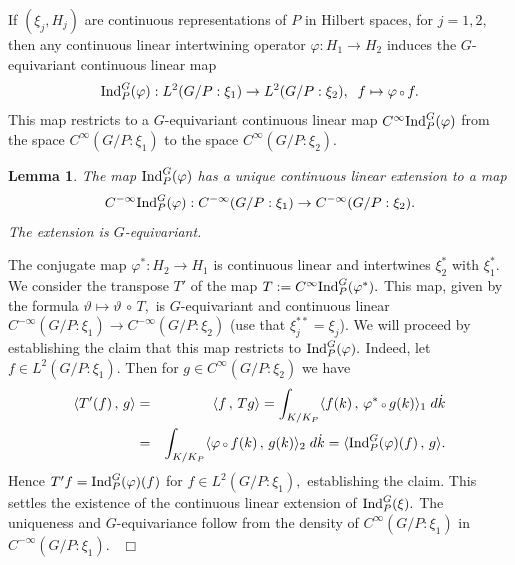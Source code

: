 \documentclass[12pt,a4paper]{article}
\newtheorem{Lemma}[Thm]{Lemma}
\newenvironment{lemma}[0]{\begin{Lemma}\noindent}%
{\end{Lemma}}
\def\proof{\par\noindent{\it Proof.}{\ }{\ }}
\def\qed{~\hfill\hbox{$\Box$}\medbreak}
\def\gf{\varphi}
\def\to{\rightarrow}
\def\inp#1#2{\langle#1\,,\,#2\rangle}
\def\after{\,{\scriptstyle\circ}\,}
\numberwithin{Thm}{section}
\numberwithin{equation}{section}
\def\Ind{{\rm Ind}}
\numberwithin{equation}{section}
\begin{document}
If $(\xi_j, H_j)$ are continuous representations of $P$ in Hilbert spaces,
 for $j=1,2,$ 
then any continuous linear intertwining operator $\gf: H_1 \to H_2$ induces the $G$-equivariant continuous linear map
$$ 
\Ind_P^G(\gf): L^2(G/P:\xi_1) \to L^2(G/P:\xi_2), \;\;f \mapsto \gf \after f.
$$%
This map restricts to a $G$-equivariant continuous linear map $C^\infty\Ind_P^G(\gf)$ from the space 
$C^\infty(G/P:\xi_1)$ to the space 
$C^\infty(G/P:\xi_2).$

\begin{lemma}
\label{l: functoriality C min infty}
The map $\Ind_P^G(\gf)$ has a unique continuous linear extension to a map 
$$
C^{-\infty}\Ind_P^G(\gf) : C^{-\infty}(G/P:\xi_1) \to C^{-\infty}(G/P:\xi_2).
$$%
The extension is $G$-equivariant.
\end{lemma} 

\proof 
The conjugate map $\gf^*: H_2 \to H_1$ is continuous linear and intertwines $\xi_2^*$ with $\xi_1^*.$ 
We consider the transpose $T'$ of the map $T:= C^\infty\Ind_P^G(\gf^*).$ This map, given by the formula
$\vartheta \mapsto \vartheta \after T,$  is $G$-equivariant and continuous linear 
$C^{-\infty}(G/P:\xi_1) \to C^{-\infty}(G/P: \xi_2)$ (use that $\xi_j^{**} = \xi_j$). We will proceed by establishing
the claim that this map restricts to $\Ind_P^G(\gf).$ Indeed, let $f\in L^2(G/P:\xi_1).$ Then for 
$g \in C^\infty(G/P:\xi_2)$ we have
\begin{eqnarray*}
\inp{T'(f)}{g} & = & \inp{f}{Tg} = \int_{K/K_P} \inp{f(k)}{\gf^*\after g(k)}_1\; d\dot{k}\\
&= & 
\int_{K/K_P} \inp{\gf\after f(k)}{g(k)}_2\; d\dot{k} =
\inp{\Ind_P^G(\gf)(f)}{g}.
\end{eqnarray*}
Hence $T' f= \Ind_P^G (\gf) (f)$ for  $f \in L^2(G/P: \xi_1),$ establishing the claim. 
This settles the existence of the continuous linear extension of $\Ind_P^G(\xi).$
The uniqueness and $G$-equivariance follow from the density of 
$C^\infty(G/P: \xi_1)$ in $C^{-\infty}(G/P: \xi_1).$ 
\qed
\end{document}
